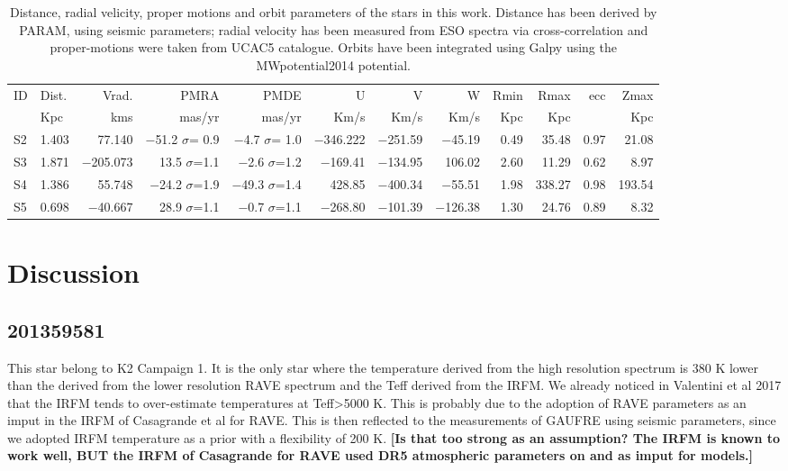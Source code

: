 \documentclass{aa}
\begin{document}
\begin{table}
\centering
\begin{tabular}{llrrrrrrrrrr}
\hline \hline
ID & Dist.& Vrad. & PMRA & PMDE & U & V & W &  Rmin & Rmax & ecc & Zmax \\ 
   & Kpc  & kms   & mas/yr & mas/yr & Km/s & Km/s & Km/s & Kpc  & Kpc &   & Kpc   \\ \hline
S2 & 1.403& 77.140 & $-$51.2 $\sigma$= 0.9 & $-$4.7 $\sigma$= 1.0 & $-$346.222 &$-$251.59 & $-$45.19& 0.49 & 35.48 & 0.97 & 21.08 \\
S3& 1.871& $-$205.073 &  13.5 $\sigma$=1.1 & $-$2.6 $\sigma$=1.2 & $-$169.41& $-$134.95 &  106.02&   2.60 & 11.29 & 0.62 & 8.97 \\
S4& 1.386& 55.748 &  $-$24.2 $\sigma$=1.9 &$-$49.3 $\sigma$=1.4  &  428.85& $-$400.34& $-$55.51&    1.98 & 338.27 & 0.98 & 193.54 \\
S5& 0.698& $-$40.667 &  28.9 $\sigma$=1.1 & $-$0.7 $\sigma$=1.1  & $-$268.80&$-$101.39 & $-$126.38&   1.30 & 24.76 & 0.89 & 8.32 \\ \hline
\end{tabular}
\caption{Distance, radial velicity, proper motions and orbit parameters of the stars in this work. Distance has been derived by PARAM, using seismic parameters; radial velocity has been measured from ESO spectra via cross-correlation and proper-motions were taken from UCAC5 catalogue. Orbits have been integrated using Galpy using the MWpotential2014 potential.}
\label{Tab:orbits}
\end{table}


\section{Discussion} 

\subsection{201359581}
This star belong to K2 Campaign 1. It is the only star where the temperature derived from the high resolution spectrum is 380 K lower than the \Teff derived from the lower resolution RAVE spectrum and the Teff derived from the IRFM. We already noticed in Valentini et al 2017 that the IRFM tends to over-estimate temperatures at Teff>5000 K. This is probably due to the adoption of RAVE parameters as an imput in the IRFM of Casagrande et al for RAVE. This is then reflected to the measurements of GAUFRE using seismic parameters, since we adopted IRFM temperature as a prior with a flexibility of 200 K. {\bf [Is that too strong as an assumption? The IRFM is known to work well, BUT the IRFM of Casagrande for RAVE used DR5 atmospheric parameters on \logg and \FeH as imput for models.]}
\end{document}
